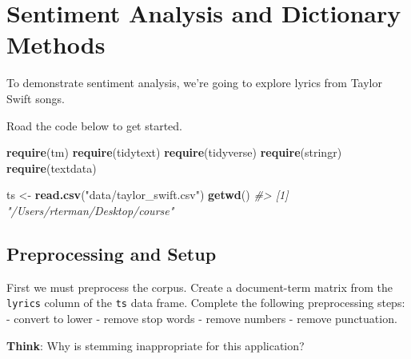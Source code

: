 \documentclass[]{book}
\newenvironment{Shaded}{\begin{snugshade}}{\end{snugshade}}
\newcommand{\CommentTok}[1]{\textcolor[rgb]{0.56,0.35,0.01}{\textit{#1}}}
\newcommand{\DataTypeTok}[1]{\textcolor[rgb]{0.13,0.29,0.53}{#1}}
\newcommand{\KeywordTok}[1]{\textcolor[rgb]{0.13,0.29,0.53}{\textbf{#1}}}
\newcommand{\NormalTok}[1]{#1}
\newcommand{\OperatorTok}[1]{\textcolor[rgb]{0.81,0.36,0.00}{\textbf{#1}}}
\newcommand{\OtherTok}[1]{\textcolor[rgb]{0.56,0.35,0.01}{#1}}
\newcommand{\StringTok}[1]{\textcolor[rgb]{0.31,0.60,0.02}{#1}}
\begin{document}
\hypertarget{sentiment-analysis-and-dictionary-methods}{%
\section{Sentiment Analysis and Dictionary Methods}\label{sentiment-analysis-and-dictionary-methods}}

To demonstrate sentiment analysis, we're going to explore lyrics from Taylor Swift songs.

Road the code below to get started.

\begin{Shaded}
\begin{Highlighting}[]
\KeywordTok{require}\NormalTok{(tm)}
\KeywordTok{require}\NormalTok{(tidytext)}
\KeywordTok{require}\NormalTok{(tidyverse)}
\KeywordTok{require}\NormalTok{(stringr)}
\KeywordTok{require}\NormalTok{(textdata)}

\NormalTok{ts <-}\StringTok{ }\KeywordTok{read.csv}\NormalTok{(}\StringTok{"data/taylor_swift.csv"}\NormalTok{)}
\KeywordTok{getwd}\NormalTok{()}
\CommentTok{#> [1] "/Users/rterman/Desktop/course"}
\end{Highlighting}
\end{Shaded}

\hypertarget{preprocessing-and-setup}{%
\subsection{Preprocessing and Setup}\label{preprocessing-and-setup}}

First we must preprocess the corpus. Create a document-term matrix from the \texttt{lyrics} column of the \texttt{ts} data frame. Complete the following preprocessing steps:
- convert to lower
- remove stop words
- remove numbers
- remove punctuation.

\textbf{Think}: Why is stemming inappropriate for this application?

\begin{Shaded}
\end{Shaded}
\end{document}
